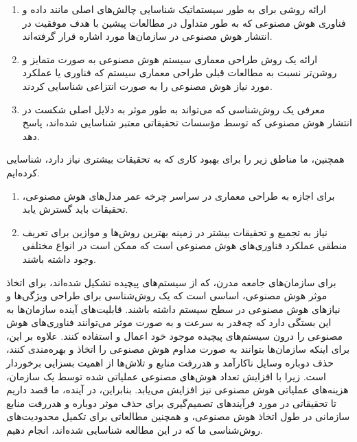 \documentclass[a4paper,10pt]{article}
\begin{document}
        \begin{enumerate}
            
            \item ارائه روشی برای به طور سیستماتیک شناسایی چالش‌های اصلی مانند داده و فناوری هوش مصنوعی که به طور متداول در مطالعات پیشین با هدف موفقیت در انتشار هوش مصنوعی در سازمان‌ها مورد اشاره قرار گرفته‌اند.

            \item ارائه یک روش طراحی معماری سیستم هوش مصنوعی به صورت متمایز و روشن‌تر نسبت به مطالعات قبلی طراحی معماری سیستم که فناوری یا عملکرد مورد نیاز هوش مصنوعی را به صورت انتزاعی شناسایی کردند.

            \item معرفی یک روش‌شناسی که می‌تواند به طور موثر به دلایل اصلی شکست در انتشار هوش مصنوعی که توسط مؤسسات تحقیقاتی معتبر شناسایی شده‌اند، پاسخ دهد.

        \end{enumerate}

        همچنین، ما مناطق زیر را برای بهبود کاری که به تحقیقات بیشتری نیاز دارد، شناسایی کرده‌ایم.

        \begin{enumerate}
            
            \item برای اجازه به طراحی معماری در سراسر چرخه عمر مدل‌های هوش مصنوعی، تحقیقات باید گسترش یابد.

            \item نیاز به تجمیع و تحقیقات بیشتر در زمینه بهترین روش‌ها و موازین برای تعریف منطقی عملکرد فناوری‌های هوش مصنوعی است که ممکن است در انواع مختلفی وجود داشته باشند.

        \end{enumerate}

        برای سازمان‌های جامعه مدرن، که از سیستم‌های پیچیده تشکیل شده‌اند، برای اتخاذ موثر هوش مصنوعی، اساسی است که یک روش‌شناسی برای طراحی ویژگی‌ها و نیازهای هوش مصنوعی در سطح سیستم داشته باشند. قابلیت‌های آینده سازمان‌ها به این بستگی دارد که چه‌قدر به سرعت و به صورت موثر می‌توانند فناوری‌های هوش مصنوعی را درون سیستم‌های پیچیده موجود خود اعمال و استفاده کنند. علاوه بر این، برای اینکه سازمان‌ها بتوانند به صورت مداوم هوش مصنوعی را اتخاذ و بهره‌مندی کنند، حذف دوباره وسایل ناکارآمد و هدررفت منابع و تلاش‌ها از اهمیت بسزایی برخوردار است. زیرا با افزایش تعداد هوش‌های مصنوعی عملیاتی شده توسط یک سازمان، هزینه‌های عملیاتی هوش مصنوعی نیز افزایش می‌یابد. بنابراین، در آینده، ما قصد داریم تا تحقیقاتی در مورد فرآیندهای تصمیم‌گیری برای حذف موثر دوباره و هدررفت منابع سازمانی در طول اتخاذ هوش مصنوعی، و همچنین مطالعاتی برای تکمیل محدودیت‌های روش‌شناسی ما که در این مطالعه شناسایی شده‌اند، انجام دهیم.
\end{document}
